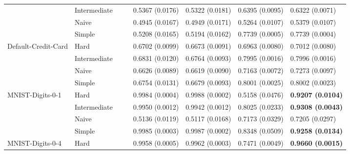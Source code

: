 \begin{tabular}{llllllll}
                 & Intermediate &                  &                           &           0.5367 (0.0176) &           0.5322 (0.0181) &           0.6395 (0.0095) &           0.6322 (0.0071) \\
                 & Naive &                  &                           &           0.4945 (0.0167) &           0.4949 (0.0171) &           0.5264 (0.0107) &           0.5379 (0.0107) \\
                 & Simple &                  &                           &           0.5208 (0.0165) &           0.5194 (0.0162) &           0.7739 (0.0005) &           0.7739 (0.0004) \\
Default-Credit-Card & Hard &                  &                           &           0.6702 (0.0099) &           0.6673 (0.0091) &           0.6963 (0.0080) &           0.7012 (0.0080) \\
                 & Intermediate &                  &                           &           0.6831 (0.0120) &           0.6764 (0.0093) &           0.7995 (0.0016) &           0.7996 (0.0016) \\
                 & Naive &                  &                           &           0.6626 (0.0089) &           0.6619 (0.0090) &           0.7163 (0.0072) &           0.7273 (0.0097) \\
                 & Simple &                  &                           &           0.6754 (0.0131) &           0.6679 (0.0093) &           0.8001 (0.0025) &           0.8002 (0.0023) \\
MNIST-Digits-0-1 & Hard &                  &                           &           0.9984 (0.0004) &           0.9988 (0.0002) &           0.5158 (0.0476) &  \textbf{0.9207 (0.0104)} \\
                 & Intermediate &                  &                           &           0.9950 (0.0012) &           0.9942 (0.0012) &           0.8025 (0.0233) &  \textbf{0.9308 (0.0043)} \\
                 & Naive &                  &                           &           0.5136 (0.0119) &           0.5117 (0.0168) &           0.7173 (0.0329) &           0.7205 (0.0297) \\
                 & Simple &                  &                           &           0.9985 (0.0003) &           0.9987 (0.0002) &           0.8348 (0.0509) &  \textbf{0.9258 (0.0134)} \\
MNIST-Digits-0-4 & Hard &                  &                           &           0.9958 (0.0005) &           0.9962 (0.0003) &           0.7471 (0.0049) &  \textbf{0.9660 (0.0015)} \\

\end{tabular}
